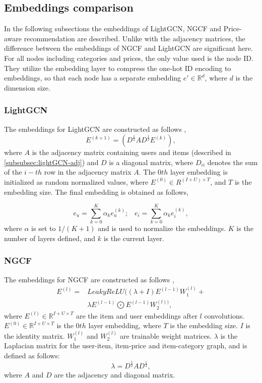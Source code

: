 \subsection{Embeddings comparison}
In the following subsections the embeddings of LightGCN, NGCF and Price-aware recommendation are described.
Unlike with the adjacency matrices, the difference between the embeddings of NGCF and LightGCN are significant here.
For all nodes including categories and prices, the only value used is the node ID.
They utilize the embedding layer to compress the one-hot ID encoding to embeddings, so that each node has a separate embedding $e' \in \mathbb{R}^d$, where $d$ is the dimension size.

\subsubsection{LightGCN}\label{subsubsec:lightgcn-embedding}
The embeddings for LightGCN are constructed as follows \cite{lightgcn},
\begin{equation}
    E^{(k+1)} = (D^{\frac{1}{2}}AD^{\frac{1}{2}}E^{(k)}),
\end{equation}
where $A$ is the adjacency matrix containing users and items (described in \autoref{subsubsec:lightGCN-adj}) and $D$ is a diagonal matrix, where $D_{ii}$ denotes the sum of the $i-th$ row in the adjacency matrix $A$.
The $0th$ layer embedding is initialized as random normalized values, where $E^{(0)} \in R^{(I + U)\times T}$, and $T$ is the embedding size.
The final embedding is obtained as follows,

\begin{equation}
    e_u = \sum_{k=0}^{K} \alpha_k e_u^{(k)};\;\;\; e_i = \sum_{k=0}^{K} \alpha_k e_i^{(k)},
\end{equation}
where $\alpha$ is set to $1/(K + 1)$ and is used to normalize the embeddings.
$K$ is the number of layers defined, and $k$ is the current layer.

\subsubsection{NGCF}\label{subsubsec:NGCF-embed}
The embeddings for NGCF are constructed as follows \cite{NGCF_2019},
\begin{equation}
    \begin{split}
        E^{(l)} = &LeakyReLU((\lambda + I)E^{(l-1)}W_1^{(l)}+\\
        & \lambda E^{(l-1)}\bigodot E^{(l-1)}W_2^{(l))},
    \end{split}
\end{equation}
where $E^{(l)} \in \mathbb{R}^{I+U \times T}$ are the item and user embeddings after $l$ convolutions.
$E^{(0)} \in \mathbb{R}^{I+U \times T}$ is the $0th$ layer embedding, where $T$ is the embedding size.
$I$ is the identity matrix.
$W_1^{(l)}$ and $W_2^{(l)}$ are trainable weight matrices.
$\lambda$ is the Laplacian matrix for the user-item, item-price and item-category graph, and is defined as follows:
\begin{equation}
    \lambda = D^{\frac{1}{2}}AD^{\frac{1}{2}},
\end{equation}
where $A$ and $D$ are the adjacency and diagonal matrix.

